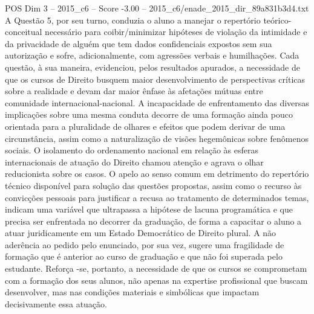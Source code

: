\begin{textsample}{POS Dim 3 – 2015\_c6 – Score -3.00 – 2015\_c6/enade\_2015\_dir\_89a831b3d4.txt}
A Questão 5, por seu turno, conduzia o aluno a manejar o repertório teórico-conceitual necessário para coibir/minimizar hipóteses de violação da intimidade e da privacidade de alguém que tem dados confidenciais expostos sem sua autorização e sofre, adicionalmente, com agressões verbais e humilhações.
Cada questão, à sua maneira, evidenciou, pelos resultados apurados, a necessidade de que os cursos de Direito busquem maior desenvolvimento de perspectivas críticas sobre a realidade e devam dar maior ênfase às afetações mútuas entre comunidade internacional-nacional.
A incapacidade de enfrentamento das diversas implicações sobre uma mesma conduta decorre de uma formação ainda pouco orientada para a pluralidade de olhares e efeitos que podem derivar de uma circunstância, assim como a naturalização de visões hegemônicas sobre fenômenos sociais.
O isolamento do ordenamento nacional em relação às esferas internacionais de atuação do Direito chamou atenção e agrava o olhar reducionista sobre os casos.
O apelo ao senso comum em detrimento do repertório técnico disponível para solução das questões propostas, assim como o recurso às convicções pessoais para justificar a recusa ao tratamento de determinados temas, indicam uma variável que ultrapassa a hipótese de lacuna programática e que precisa ser enfrentada no decorrer da graduação, de forma a capacitar o aluno a atuar juridicamente em um Estado Democrático de Direito plural.
A não aderência ao pedido pelo enunciado, por sua vez, sugere uma fragilidade de formação que é anterior ao curso de graduação e que não foi superada pelo estudante.
Reforça -se, portanto, a necessidade de que os cursos se comprometam com a formação dos seus alunos, não apenas na expertise profissional que buscam desenvolver, mas nas condições materiais e simbólicas que impactam decisivamente essa atuação.

\end{textsample}
